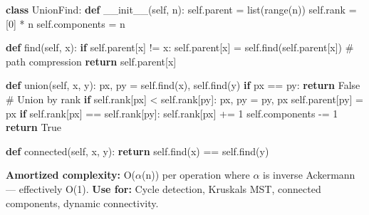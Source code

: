 \documentclass[11pt]{article}
\newenvironment{Shaded}{\begin{snugshade}}{\end{snugshade}}
\newcommand{\BuiltInTok}[1]{\textcolor[rgb]{0.50,0.55,0.55}{#1}}
\newcommand{\CommentTok}[1]{\textcolor[rgb]{0.48,0.49,0.49}{#1}}
\newcommand{\ControlFlowTok}[1]{\textcolor[rgb]{0.99,0.74,0.29}{\textbf{#1}}}
\newcommand{\DecValTok}[1]{\textcolor[rgb]{0.96,0.45,0.00}{#1}}
\newcommand{\FunctionTok}[1]{\textcolor[rgb]{0.56,0.27,0.68}{#1}}
\newcommand{\KeywordTok}[1]{\textcolor[rgb]{0.81,0.81,0.76}{\textbf{#1}}}
\newcommand{\NormalTok}[1]{\textcolor[rgb]{0.81,0.81,0.76}{#1}}
\newcommand{\OperatorTok}[1]{\textcolor[rgb]{0.81,0.81,0.76}{#1}}
\newcommand{\VariableTok}[1]{\textcolor[rgb]{0.15,0.68,0.68}{#1}}
\begin{document}

\begin{Shaded}
\begin{Highlighting}[]
\KeywordTok{class}\NormalTok{ UnionFind:}
    \KeywordTok{def} \FunctionTok{\_\_init\_\_}\NormalTok{(}\VariableTok{self}\NormalTok{, n):}
        \VariableTok{self}\NormalTok{.parent }\OperatorTok{=} \BuiltInTok{list}\NormalTok{(}\BuiltInTok{range}\NormalTok{(n))}
        \VariableTok{self}\NormalTok{.rank }\OperatorTok{=}\NormalTok{ [}\DecValTok{0}\NormalTok{] }\OperatorTok{*}\NormalTok{ n}
        \VariableTok{self}\NormalTok{.components }\OperatorTok{=}\NormalTok{ n}

    \KeywordTok{def}\NormalTok{ find(}\VariableTok{self}\NormalTok{, x):}
        \ControlFlowTok{if} \VariableTok{self}\NormalTok{.parent[x] }\OperatorTok{!=}\NormalTok{ x:}
            \VariableTok{self}\NormalTok{.parent[x] }\OperatorTok{=} \VariableTok{self}\NormalTok{.find(}\VariableTok{self}\NormalTok{.parent[x])   }\CommentTok{\# path compression}
        \ControlFlowTok{return} \VariableTok{self}\NormalTok{.parent[x]}

    \KeywordTok{def}\NormalTok{ union(}\VariableTok{self}\NormalTok{, x, y):}
\NormalTok{        px, py }\OperatorTok{=} \VariableTok{self}\NormalTok{.find(x), }\VariableTok{self}\NormalTok{.find(y)}
        \ControlFlowTok{if}\NormalTok{ px }\OperatorTok{==}\NormalTok{ py: }\ControlFlowTok{return} \VariableTok{False}
        \CommentTok{\# Union by rank}
        \ControlFlowTok{if} \VariableTok{self}\NormalTok{.rank[px] }\OperatorTok{\textless{}} \VariableTok{self}\NormalTok{.rank[py]:}
\NormalTok{            px, py }\OperatorTok{=}\NormalTok{ py, px}
        \VariableTok{self}\NormalTok{.parent[py] }\OperatorTok{=}\NormalTok{ px}
        \ControlFlowTok{if} \VariableTok{self}\NormalTok{.rank[px] }\OperatorTok{==} \VariableTok{self}\NormalTok{.rank[py]:}
            \VariableTok{self}\NormalTok{.rank[px] }\OperatorTok{+=} \DecValTok{1}
        \VariableTok{self}\NormalTok{.components }\OperatorTok{{-}=} \DecValTok{1}
        \ControlFlowTok{return} \VariableTok{True}

    \KeywordTok{def}\NormalTok{ connected(}\VariableTok{self}\NormalTok{, x, y):}
        \ControlFlowTok{return} \VariableTok{self}\NormalTok{.find(x) }\OperatorTok{==} \VariableTok{self}\NormalTok{.find(y)}
\end{Highlighting}
\end{Shaded}

\textbf{Amortized complexity:} O(\(\alpha\)(n)) per operation where \(\alpha\) is inverse Ackermann --- effectively O(1).
\textbf{Use for:} Cycle detection, Kruskal\textquotesingle s MST, connected components, dynamic connectivity.
\end{document}
